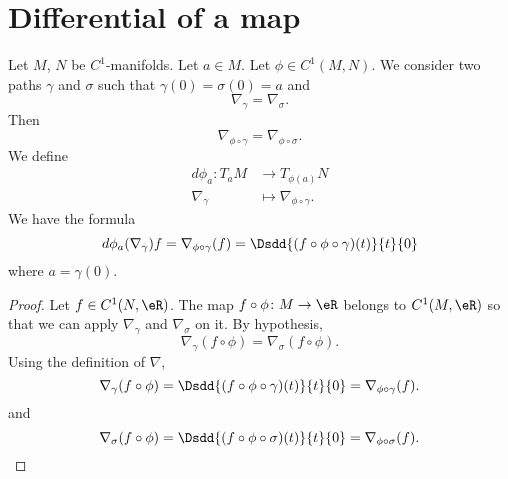 \section{Differential of a map}

\begin{propositionDef}      \label{DEFooDRGUooDPFIJa}
	Let \( M\), \( N\) be \( C^1\)-manifolds. Let \( a\in M\). Let \( \phi\in C^1(M,N)\). We consider two paths \( \gamma\) and \( \sigma\) such that \( \gamma(0)=\sigma(0)=a\) and
	\begin{equation}
		\nabla_{\gamma}=\nabla_{\sigma}.
	\end{equation}
	Then
	\begin{equation}
		\nabla_{\phi\circ \gamma}=\nabla_{\phi\circ \sigma}.
	\end{equation}
	We define
	\begin{equation}        \label{EQooQNZPooMVaSQC}
		\begin{aligned}
			d\phi_a\colon T_aM & \to T_{\phi(a)}N                   \\
			\nabla_{\gamma}    & \mapsto \nabla_{\phi\circ \gamma}.
		\end{aligned}
	\end{equation}
	We have the formula
	\begin{equation}        \label{EQooEWMRooFsSVpb}
		d\phi_a(\nabla_{\gamma})f=\nabla_{\phi\circ \gamma}(f)=\Dsdd{ (f\circ\phi\circ\gamma)(t) }{t}{0}
	\end{equation}
	where \( a=\gamma(0)\).
\end{propositionDef}

\begin{proof}
	Let \( f\in C^1(N,\eR)\). The map \( f\circ\phi\colon M\to \eR\) belongs to \( C^1(M,\eR)\) so that we can apply \( \nabla_{\gamma}\) and \( \nabla_{\sigma}\) on it. By hypothesis,
	\begin{equation}
		\nabla_{\gamma}(f\circ \phi)=\nabla_{\sigma}(f\circ \phi).
	\end{equation}
	Using the definition of \( \nabla\),
	\begin{equation}
		\nabla_{\gamma}(f\circ\phi)=\Dsdd{ (f\circ \phi\circ \gamma)(t) }{t}{0}=\nabla_{\phi\circ\gamma}(f).
	\end{equation}
	and
	\begin{equation}
		\nabla_{\sigma}(f\circ\phi)=\Dsdd{ (f\circ \phi\circ \sigma)(t) }{t}{0}=\nabla_{\phi\circ\sigma}(f).
	\end{equation}
\end{proof}

